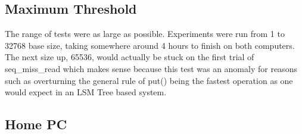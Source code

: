 \documentclass[twocolumn,11pt]{article}
\begin{document}
\subsection{Maximum Threshold}
\label{subsec:max_threshold}

The range of tests were as large as possible. Experiments were run from 1 to
32768 base size, taking somewhere around 4 hours to finish on both computers.
The next size up, 65536, would actually be stuck on the first trial of
seq\_miss\_read which makes sense because this test was an anomaly for reasons
such as overturning the general rule of put() being the fastest operation as
one would expect in an LSM Tree based system.

\subsection{Home PC}
\end{document}
